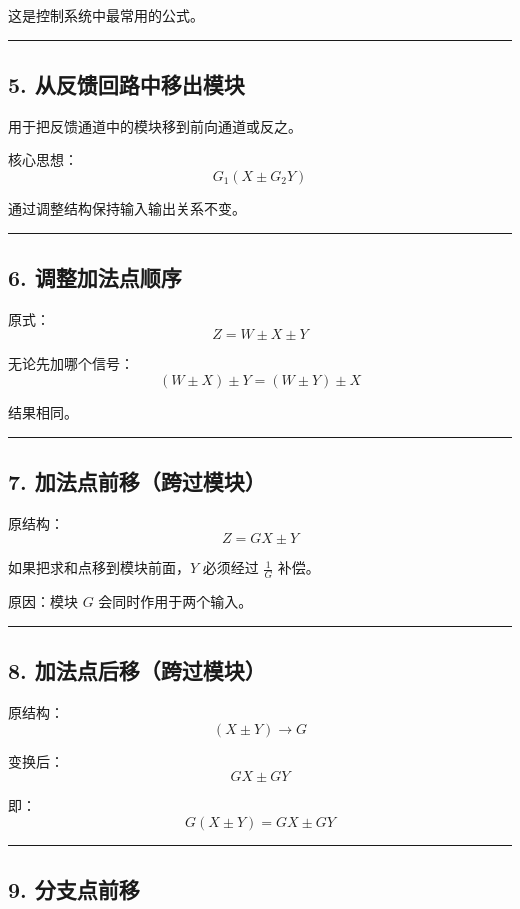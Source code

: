 \documentclass[UTF8,a4paper,11pt]{ctexart}
\begin{document}
这是控制系统中最常用的公式。

\bigskip\noindent\rule{\linewidth}{0.4pt}\bigskip

\subsection{5. 从反馈回路中移出模块}

用于把反馈通道中的模块移到前向通道或反之。

核心思想：
\[
G_1(X\pm G_2Y)
\]

通过调整结构保持输入输出关系不变。

\bigskip\noindent\rule{\linewidth}{0.4pt}\bigskip

\subsection{6. 调整加法点顺序}

原式：
\[
Z=W\pm X\pm Y
\]

无论先加哪个信号：
\[
(W\pm X)\pm Y=(W\pm Y)\pm X
\]

结果相同。

\bigskip\noindent\rule{\linewidth}{0.4pt}\bigskip

\subsection{7. 加法点前移（跨过模块）}

原结构：
\[
Z=GX\pm Y
\]

如果把求和点移到模块前面，$Y$ 必须经过 $\frac{1}{G}$ 补偿。

原因：模块 $G$ 会同时作用于两个输入。

\bigskip\noindent\rule{\linewidth}{0.4pt}\bigskip

\subsection{8. 加法点后移（跨过模块）}

原结构：
\[
(X\pm Y)\rightarrow G
\]

变换后：
\[
GX \pm GY
\]

即：
\[
G(X\pm Y)=GX\pm GY
\]

\bigskip\noindent\rule{\linewidth}{0.4pt}\bigskip

\subsection{9. 分支点前移}
\end{document}
